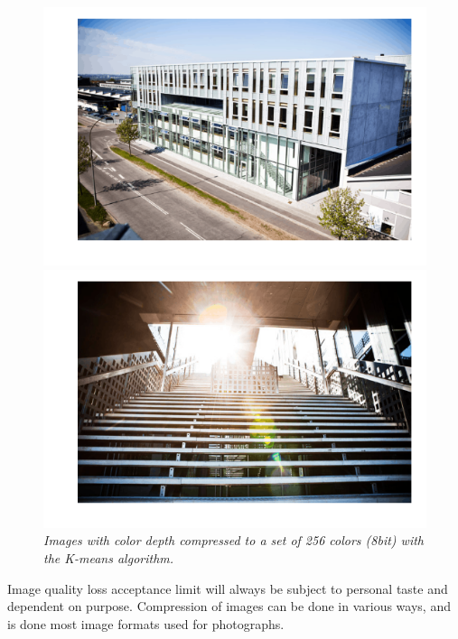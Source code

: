 \documentclass[a4paper,10pt,article,oneside,english]{memoir}
\let\oldcaption\caption
\renewcommand{\caption}[1]{\oldcaption{\emph{#1}}}
\begin{document}
\begin{figure}
	\centering
	\begin{minipage}{.48\textwidth}
		\includegraphics[width=\textwidth]{nygaard_facade_k256.png}
	\end{minipage}
	\hfill
	\begin{minipage}{.48\textwidth}
		\includegraphics[width=\textwidth]{nygaard_stairs_k256.png}
	\end{minipage}
	\caption{Images with color depth compressed to a set of 256 colors (8bit) with the K-means algorithm.}
	\label{fig:comp256}
\end{figure}

Image quality loss acceptance limit will always be subject to personal taste and dependent on purpose. Compression of images can be done in various ways, and is done most image formats used for photographs. 
\end{document}
